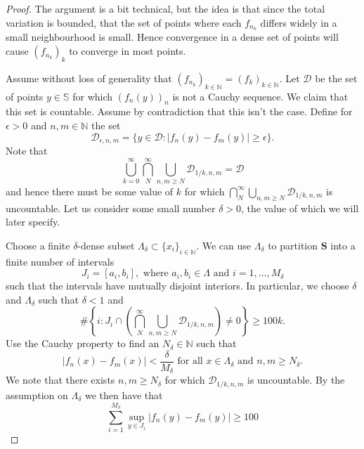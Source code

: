 \documentclass[pdftex,11pt,a4paper,oneside]{article}
\theoremstyle{plain}
\begin{document}
\begin{proof}
The argument is a bit technical, but the idea is that since the total variation is bounded, that the set of points where each $f_{n_k}$ differs widely in a small neighbourhood is small. Hence convergence in a dense set of points will cause $(f_{n_k})_k$ to converge in most points. 


Assume without loss of generality that $(f_{n_k})_{k\in\mathbb{N}} = (f_k)_{k\in\mathbb{N}}$.
Let $\mathcal{D}$ be the set of points $y\in\mathbb{S}$ for which $(f_n(y))_n$ is not a Cauchy sequence. We claim that this set is countable. Assume by contradiction that this isn't the case. Define for $\epsilon>0$ and $n,m\in \mathbb{N}$ the set
\[\mathcal{D}_{\epsilon,n,m} = \{y\in\mathcal{D}:|f_n(y)- f_m(y)|\geq\epsilon\}.\]
Note that
\[\bigcup_{k=0}^\infty\bigcap_{N}^\infty\bigcup_{n,m\geq N }\mathcal{D}_{1/k,n,m}=\mathcal{D}\]
and hence there must be some value of $k$ for which $\bigcap_{N}^\infty\bigcup_{n,m\geq N }\mathcal{D}_{1/k,n,m}$ is uncountable. Let us consider some small number $\delta >0$, the value of which we will later specify.

Choose a finite $\delta$-dense subset $\Lambda_\delta\subset \{x_i\}_{i\in\mathbb{N}}$. We can use $\Lambda_\delta$ to partition $\mathbf{S}$ into a finite number of intervals \[J_i = [a_i,b_i], \text{ where } a_i,b_i\in \Lambda \text{ and } i=1,\ldots,M_\delta\]  
such that the intervals have mutually disjoint interiors. In particular, we choose $\delta$ and $\Lambda_\delta$ such that $\delta <1$ and 
\[\#\left\{i: J_i\cap \left(\bigcap_{N}^\infty\bigcup_{n,m\geq N }\mathcal{D}_{1/k,n,m}\right)\neq 0\right\}\geq 100k.\]
Use the Cauchy property to find an $N_\delta\in \mathbb{N}$ such that
\begin{equation}\label{eq:UsingEpsilonDensity}
    |f_n(x)-f_m(x)|<\frac{\delta}{M_\delta}\text{ for all } x\in \Lambda_\delta\text{ and } n,m\geq N_\delta .
\end{equation}
We note that there exists $n,m\geq N_\delta$ for which $\mathcal{D}_{1/k,n,m}$ is uncountable. By the assumption on $\Lambda_\delta$ we then have that 
\begin{equation}\label{eq:UncountabilityIsHighSup}
    \sum_{i=1}^{M_\delta}\sup_{y\in J_i}|f_n(y)-f_m(y)|\geq 100
\end{equation}


\end{proof}
\end{document}
